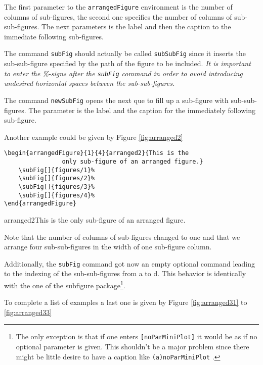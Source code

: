 \documentclass[12pt,a4paper]{article}
\newcommand{\comm}[1]{\texttt{#1}}
\begin{document}
The first parameter to the \comm{arrangedFigure} environment is the number of 
columns of sub-figures, the second one specifies the number of columns of 
sub-sub-figures. The next parameters is the label and then the caption to the immediate
following sub-figures.

The command \comm{subFig} should actually be called \comm{subSubFig} since it inserts the 
sub-sub-figure specified by the path of the figure to be included. \emph{It is important to 
enter the \%-signs after the \comm{subFig} command in order to avoid introducing 
undesired horizontal spaces between the sub-sub-figures.}

The command \comm{newSubFig} opens the next que to fill up a sub-figure with sub-sub-figures.
The parameter is the label and the caption for the immediately following sub-figure.

Another example could be given by Figure \ref{fig:arranged2}

\begin{verbatim}
\begin{arrangedFigure}{1}{4}{arranged2}{This is the 
                only sub-figure of an arranged figure.}
    \subFig[]{figures/1}%
    \subFig[]{figures/2}%
    \subFig[]{figures/3}%
    \subFig[]{figures/4}%
\end{arrangedFigure}
\end{verbatim}


\begin{arrangedFigure}{1}{4}{arranged2}{This is the only sub-figure of an arranged figure.}
\end{arrangedFigure}

Note that the number of columns of sub-figures changed to one and that we arrange four 
sub-sub-figures in the width of one sub-figure column.

Additionally, the \comm{subFig} command got now an empty optional command leading to the indexing
of the sub-sub-figures from a to d. This behavior is identically with the one of the 
subfigure package\footnote{The only exception is that if one enters \comm{[noParMiniPlot]} it would be
as if no optional parameter is given. This shouldn't be a major problem since there might be little
desire to have a caption like \comm{(a)noParMiniPlot} .}.

To complete a list of examples a last one is given by Figure \ref{fig:arranged31} to
\ref{fig:arranged33}
\end{document}
